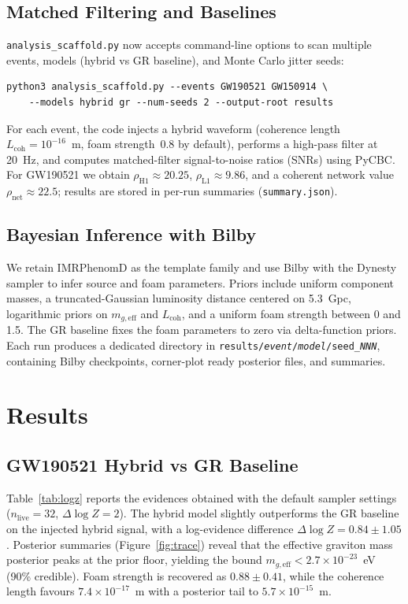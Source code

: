 \documentclass[prd,onecolumn,longbibliography,nofootinbib]{revtex4-2}
\begin{document}
\subsection{Matched Filtering and Baselines}
\texttt{analysis\_scaffold.py} now accepts command-line options to scan multiple events, models (hybrid vs GR baseline), and Monte Carlo jitter seeds:
\begin{verbatim}
python3 analysis_scaffold.py --events GW190521 GW150914 \
    --models hybrid gr --num-seeds 2 --output-root results
\end{verbatim}
For each event, the code injects a hybrid waveform (coherence length $L_{\mathrm{coh}}=10^{-16}$~m, foam strength~0.8 by default), performs a high-pass filter at \SI{20}{Hz}, and computes matched-filter signal-to-noise ratios (SNRs) using PyCBC. For GW190521 we obtain $\rho_{\mathrm{H1}} \approx 20.25$, $\rho_{\mathrm{L1}} \approx 9.86$, and a coherent network value $\rho_{\mathrm{net}} \approx 22.5$; results are stored in per-run summaries (\texttt{summary.json}).

\subsection{Bayesian Inference with Bilby}
We retain IMRPhenomD as the template family and use Bilby with the Dynesty sampler to infer source and foam parameters. Priors include uniform component masses, a truncated-Gaussian luminosity distance centered on \SI{5.3}{Gpc}, logarithmic priors on $m_{g,\mathrm{eff}}$ and $L_{\mathrm{coh}}$, and a uniform foam strength between 0 and 1.5. The GR baseline fixes the foam parameters to zero via delta-function priors. Each run produces a dedicated directory in \texttt{results/\textit{event}/\textit{model}/seed\_\textit{NNN}}, containing Bilby checkpoints, corner-plot ready posterior files, and summaries.

\section{Results}
\subsection{GW190521 Hybrid vs GR Baseline}
Table~\ref{tab:logz} reports the evidences obtained with the default sampler settings ($n_{\mathrm{live}}=32$, $\Delta \log Z=2$). The hybrid model slightly outperforms the GR baseline on the injected hybrid signal, with a log-evidence difference $\Delta \log Z = 0.84 \pm 1.05$. Posterior summaries (Figure~\ref{fig:trace}) reveal that the effective graviton mass posterior peaks at the prior floor, yielding the bound $m_{g,\mathrm{eff}} < 2.7 \times 10^{-23}$~eV (90\% credible). Foam strength is recovered as $0.88 \pm 0.41$, while the coherence length favours $7.4\times10^{-17}$~m with a posterior tail to $5.7\times10^{-15}$~m.
\end{document}

